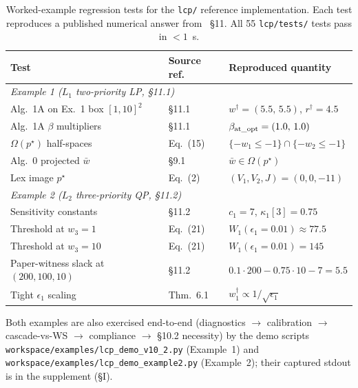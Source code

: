 \begin{table}[h]
    \centering
    \caption{Worked-example regression tests for the \texttt{lcp/} reference implementation. Each test reproduces a published numerical answer from~\cite{lcp2025} \S11. All 55 \texttt{lcp/tests/} tests pass in $<1$~s.}
    \label{tab:framework_examples}
    \footnotesize
    \begin{tabularx}{\linewidth}{@{}l l X@{}}
        \toprule
        Test & Source ref. & Reproduced quantity \\
        \midrule
        \multicolumn{3}{l}{\emph{Example 1 ($L_1$ two-priority LP, \cite{lcp2025} \S11.1)}} \\
        Alg.~1A on Ex.~1 box $[1,10]^2$ & \S11.1 & $w^\dagger = (5.5,\,5.5)$, $r^\dagger = 4.5$ \\
        Alg.~1A $\beta$ multipliers     & \S11.1 & $\beta_{\rm at\_opt} = (1.0,\,1.0)$ \\
        $\Omega(p^\star)$ half-spaces   & Eq.~(15) & $\{-w_1 \le -1\} \cap \{-w_2 \le -1\}$ \\
        Alg.~0 projected $\bar w$       & \S9.1   & $\bar w \in \Omega(p^\star)$ \\
        Lex image $p^\star$             & Eq.~(2) & $(V_1, V_2, J) = (0, 0, -11)$ \\
        \midrule
        \multicolumn{3}{l}{\emph{Example 2 ($L_2$ three-priority QP, \cite{lcp2025} \S11.2)}} \\
        Sensitivity constants    & \S11.2 & $c_1 = 7$, $\kappa_1[3] = 0.75$ \\
        Threshold at $w_3 = 1$   & Eq.~(21) & $W_1(\epsilon_1{=}0.01) \approx 77.5$ \\
        Threshold at $w_3 = 10$  & Eq.~(21) & $W_1(\epsilon_1{=}0.01) = 145$ \\
        Paper-witness slack at $(200, 100, 10)$ & \S11.2 & $0.1{\cdot}200 - 0.75{\cdot}10 - 7 = 5.5$ \\
        Tight $\epsilon_1$ scaling & Thm.~6.1 & $w^\dagger_1 \propto 1/\sqrt{\epsilon_1}$ \\
        \bottomrule
    \end{tabularx}
\end{table}

Both examples are also exercised end-to-end (diagnostics $\to$ calibration $\to$ cascade-vs-WS $\to$ compliance $\to$ \S10.2 necessity) by the demo scripts \texttt{workspace/examples/lcp\_demo\_v10\_2.py} (Example~1) and \texttt{workspace/examples/lcp\_demo\_example2.py} (Example~2); their captured stdout is in the supplement (\S{}I).

